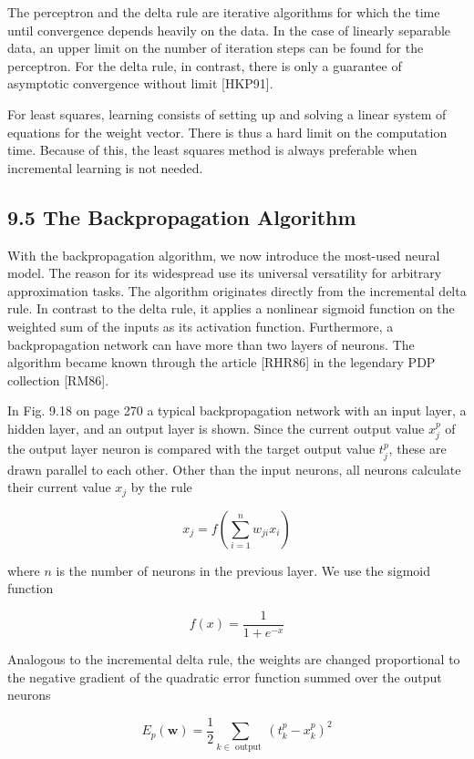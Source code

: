 \documentclass[10pt]{article}
\begin{document}
The perceptron and the delta rule are iterative algorithms for which the time until convergence depends heavily on the data. In the case of linearly separable data, an upper limit on the number of iteration steps can be found for the perceptron. For the delta rule, in contrast, there is only a guarantee of asymptotic convergence without limit [HKP91].

For least squares, learning consists of setting up and solving a linear system of equations for the weight vector. There is thus a hard limit on the computation time. Because of this, the least squares method is always preferable when incremental learning is not needed.

\subsection*{9.5 The Backpropagation Algorithm}
With the backpropagation algorithm, we now introduce the most-used neural model. The reason for its widespread use its universal versatility for arbitrary approximation tasks. The algorithm originates directly from the incremental delta rule. In contrast to the delta rule, it applies a nonlinear sigmoid function on the weighted sum of the inputs as its activation function. Furthermore, a backpropagation network can have more than two layers of neurons. The algorithm became known through the article [RHR86] in the legendary PDP collection [RM86].

In Fig. 9.18 on page 270 a typical backpropagation network with an input layer, a hidden layer, and an output layer is shown. Since the current output value $x_{j}^{p}$ of the output layer neuron is compared with the target output value $t_{j}^{p}$, these are drawn parallel to each other. Other than the input neurons, all neurons calculate their current value $x_{j}$ by the rule


\begin{equation*}
x_{j}=f\left(\sum_{i=1}^{n} w_{j i} x_{i}\right) \tag{9.14}
\end{equation*}


where $n$ is the number of neurons in the previous layer. We use the sigmoid function

$$
f(x)=\frac{1}{1+e^{-x}}
$$

Analogous to the incremental delta rule, the weights are changed proportional to the negative gradient of the quadratic error function summed over the output neurons

$$
E_{p}(\boldsymbol{w})=\frac{1}{2} \sum_{k \in \text { output }}\left(t_{k}^{p}-x_{k}^{p}\right)^{2}
$$
\end{document}
